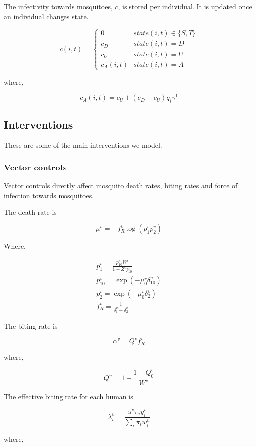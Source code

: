 \documentclass{bmcart}
\begin{document}
The infectivity towards mosquitoes, $c$, is stored per individual. It is updated once an individual changes state.

\[
c(i, t) =
\begin{cases} 
  0  & state(i, t) \in \{S, T\} \\
  c_D & state(i, t) = D \\
  c_U & state(i, t) = U \\
  c_A(i, t) & state(i, t) = A
\end{cases}
\]

where,

\[  c_A(i, t) = c_U + (c_D - c_U) q_i \gamma^1 \]

\subsection*{Interventions}

These are some of the main interventions we model.

\subsubsection*{Vector controls}

Vector controls directly affect mosquito death rates, biting rates and force of infection towards mosquitoes.

The death rate is

\[
\mu^v = -f_R^v \log(p_1^vp_2^v)
\]

Where,

\begin{gather*}
p_1^v = \frac{p_{10}^vW^v}{1 - Z^vp^v_{10}} \\
p_{10}^v = \exp(-\mu_0^v\delta^v_{10}) \\
p_2^v = \exp(-\mu_0^v\delta^v_2) \\
f_R^v = \frac{1}{\delta^v_1 + \delta^v_2}
\end{gather*}

The biting rate is

\[
\alpha^v = Q^v f^v_R
\]

where,

\[
Q^v = 1 - \frac{1 - Q_0^v}{W^v}
\]

The effective biting rate for each human is

\[
\lambda^v_i = \frac{\alpha^v\pi_iy^v_i}{\sum_i \pi_i w^v_i}
\]

where,
\end{document}
